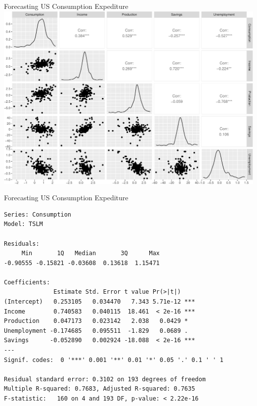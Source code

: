 \documentclass[
  ignorenonframetext,
]{beamer}
\begin{document}
\begin{frame}{Forecasting \textbar{} \small US Consumption Expediture}
\protect\hypertarget{forecasting-us-consumption-expediture-1}{}
\includegraphics{Time-series-regression-models_files/figure-beamer/unnamed-chunk-10-1.pdf}
\end{frame}

\begin{frame}[fragile]{Forecasting \textbar{} \small US Consumption
Expediture}
\protect\hypertarget{forecasting-us-consumption-expediture-2}{}
\footnotesize

\normalfont

\footnotesize

\begin{verbatim}
Series: Consumption 
Model: TSLM 

Residuals:
     Min       1Q   Median       3Q      Max 
-0.90555 -0.15821 -0.03608  0.13618  1.15471 

Coefficients:
              Estimate Std. Error t value Pr(>|t|)    
(Intercept)   0.253105   0.034470   7.343 5.71e-12 ***
Income        0.740583   0.040115  18.461  < 2e-16 ***
Production    0.047173   0.023142   2.038   0.0429 *  
Unemployment -0.174685   0.095511  -1.829   0.0689 .  
Savings      -0.052890   0.002924 -18.088  < 2e-16 ***
---
Signif. codes:  0 '***' 0.001 '**' 0.01 '*' 0.05 '.' 0.1 ' ' 1

Residual standard error: 0.3102 on 193 degrees of freedom
Multiple R-squared: 0.7683, Adjusted R-squared: 0.7635
F-statistic:   160 on 4 and 193 DF, p-value: < 2.22e-16
\end{verbatim}

\normalfont
\end{frame}
\end{document}
